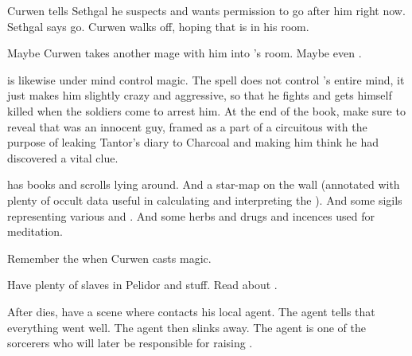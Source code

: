 \begin{garbage}
Curwen tells Sethgal he suspects \Onatol and wants permission to go after him right now.
Sethgal says go. 
Curwen walks off, hoping that \Onatol is in his room. 

Maybe Curwen takes another mage with him into \Onatol's room. 
Maybe even \Cobrel. 

\Onatol is likewise under mind control magic. 
The spell does not control \Onatol's entire mind, it just makes him slightly crazy and aggressive, so that he fights and gets himself killed when the soldiers come to arrest him. 
At the end of the book, make sure to reveal that \Onatol was an innocent guy, framed as a part of a circuitous  with the purpose of leaking Tantor's diary to Charcoal and making him think he had discovered a vital clue. 

\Onatol{} has books and scrolls lying around. 
And a star-map on the wall (annotated with plenty of occult data useful in calculating and interpreting the \matrices). 
And some sigils representing various \sephiroth{} and \qliphoth. 
And some herbs and drugs and incences used for meditation. 

Remember the  when Curwen casts magic. 

Have plenty of  slaves in Pelidor and stuff. 
Read about .

After \Onatol dies, have a scene where \LocarPsyrex contacts his local agent. 
The agent tells \Psyrex that everything went well. 
The agent then slinks away.
The agent is one of the sorcerers who will later be responsible for raising \Nithdornazsh.
\end{garbage}





